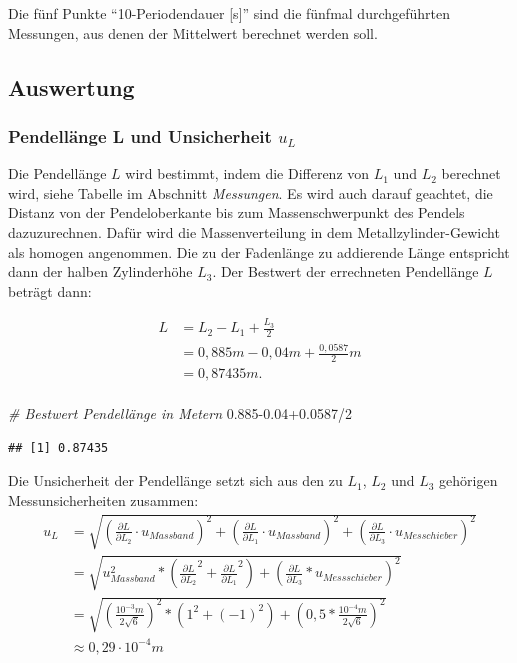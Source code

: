 \documentclass[
  9pt,
]{article}
\newenvironment{Shaded}{\begin{snugshade}}{\end{snugshade}}
\newcommand{\CommentTok}[1]{\textcolor[rgb]{0.56,0.35,0.01}{\textit{#1}}}
\newcommand{\DecValTok}[1]{\textcolor[rgb]{0.00,0.00,0.81}{#1}}
\newcommand{\FloatTok}[1]{\textcolor[rgb]{0.00,0.00,0.81}{#1}}
\newcommand{\SpecialCharTok}[1]{\textcolor[rgb]{0.00,0.00,0.00}{#1}}
\begin{document}
Die fünf Punkte ``10-Periodendauer {[}s{]}'' sind die fünfmal
durchgeführten Messungen, aus denen der Mittelwert berechnet werden
soll.

\hypertarget{auswertung}{%
\subsection{Auswertung}\label{auswertung}}

\hypertarget{pendelluxe4nge-l-und-unsicherheit-u_l}{%
\subsubsection{\texorpdfstring{Pendellänge L und Unsicherheit
\(u_L\)}{Pendellänge L und Unsicherheit u\_L}}\label{pendelluxe4nge-l-und-unsicherheit-u_l}}

Die Pendellänge \(L\) wird bestimmt, indem die Differenz von \(L_1\) und
\(L_2\) berechnet wird, siehe Tabelle im Abschnitt \textit{Messungen}.
Es wird auch darauf geachtet, die Distanz von der Pendeloberkante bis
zum Massenschwerpunkt des Pendels dazuzurechnen. Dafür wird die
Massenverteilung in dem Metallzylinder-Gewicht als homogen angenommen.
Die zu der Fadenlänge zu addierende Länge entspricht dann der halben
Zylinderhöhe \(L_3\). Der Bestwert der errechneten Pendellänge \(L\)
beträgt dann:

\begin{align*}
L&= L_2-L_1+\frac{L_{3}}{2}\\
 &=0,885m-0,04m+\frac{0,0587}{2}m\\
 &=0,87435m.\\
\end{align*}

\begin{Shaded}
\begin{Highlighting}[]
\CommentTok{\# Bestwert Pendellänge in Metern}
\FloatTok{0.885{-}0.04+0.0587}\SpecialCharTok{/}\DecValTok{2}
\end{Highlighting}
\end{Shaded}

\begin{verbatim}
## [1] 0.87435
\end{verbatim}

Die Unsicherheit der Pendellänge setzt sich aus den zu \(L_1\), \(L_2\)
und \(L_3\) gehörigen Messunsicherheiten zusammen:
\begin{equation}\label{Pendel:U_L}
\begin{split}
u_L&= \sqrt{(\frac{\partial L}{\partial L_2} \cdot u_{Massband})^2+(\frac{\partial L}{\partial L_1} \cdot u_{Massband})^2+(\frac{\partial L}{\partial L_{3}} \cdot u_{Messchieber})^2}\\
&= \sqrt{u_{Massband}^2*(\frac{\partial L}{\partial L_2}^2+\frac{\partial L}{\partial L_1}^2)+(\frac{\partial L}{\partial L_{3}}*u_{Messschieber})^2}\\
&=\sqrt{(\frac{10^{-3}m}{2\sqrt{6}})^2*(1^2+(-1)^2)+(0,5*\frac{10^{-4}m}{2\sqrt{6}})^2}\\
&\approx 0,29 \cdot 10^{-4}m\\
\end{split}
\end{equation}
\end{document}
